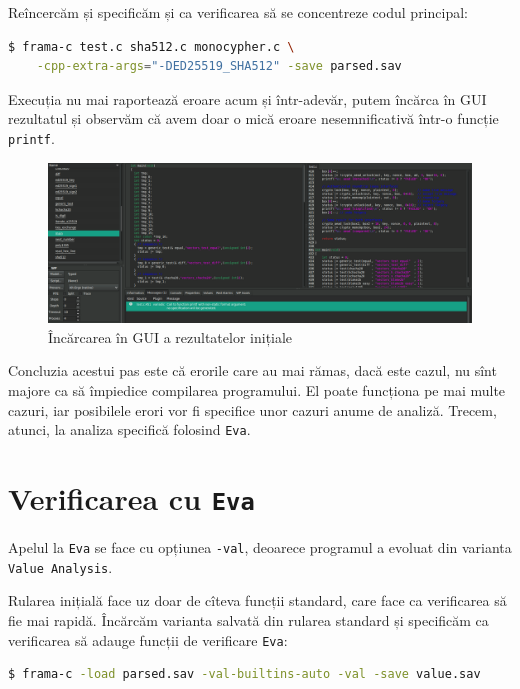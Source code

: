 Reîncercăm și specificăm și ca verificarea să se concentreze codul principal:
\begin{lstlisting}[language=sh,caption={\emph{Verificarea inițială, corectată}}]
  $ frama-c test.c sha512.c monocypher.c \
    -cpp-extra-args="-DED25519_SHA512" -save parsed.sav
\end{lstlisting}

Execuția nu mai raportează eroare acum și într-adevăr, putem încărca în GUI rezultatul și observăm
că avem doar o mică eroare nesemnificativă într-o funcție \texttt{printf}.
\begin{figure}[!htbp]
  \centering
    \includegraphics[width=1\textwidth]{img/framagui1.png}
    \caption{Încărcarea în GUI a rezultatelor inițiale}
\end{figure}

Concluzia acestui pas este că erorile care au mai rămas, dacă este cazul, nu sînt
majore ca să împiedice compilarea programului. El poate funcționa pe mai multe cazuri,
iar posibilele erori vor fi specifice unor cazuri anume de analiză. Trecem, atunci,
la analiza specifică folosind \texttt{Eva}.


\section{Verificarea cu \texttt{Eva}}

\indent\indent Apelul la \texttt{Eva} se face cu opțiunea \texttt{-val}, deoarece programul
a evoluat din varianta \texttt{Value Analysis}.

Rularea inițială face uz doar de cîteva funcții standard, care face ca verificarea
să fie mai rapidă. Încărcăm varianta salvată din rularea standard și specificăm ca
verificarea să adauge funcții de verificare \texttt{Eva}:
\begin{lstlisting}[language=sh,caption={\emph{Verificarea inițială cu} \texttt{Eva}}]
  $ frama-c -load parsed.sav -val-builtins-auto -val -save value.sav
\end{lstlisting}

